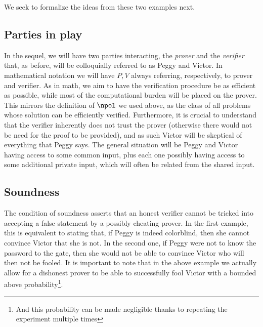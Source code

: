 \documentclass{article}
\begin{document}
We seek to formalize the ideas from these two examples next.

\subsection{Parties in play}
In the sequel, we will have two parties interacting, the \textit{prover} and the \textit{verifier} that, as before, will be colloquially referred to as Peggy and Victor. In mathematical notation we will have $P, V$ always referring, respectively, to prover and verifier. As in math, we aim to have the verification procedure be as efficient as possible, while most of the computational burden will be placed on the prover. This mirrors the definition of $\npol$ we used above, as the class of all problems whose solution can be efficiently verified. Furthermore, it is crucial to understand that the verifier inherently does not trust the prover (otherwise there would not be need for the proof to be provided), and as such Victor will be skeptical of everything that Peggy says. The general situation will be Peggy and Victor having access to some common input, plus each one possibly having access to some additional private input, which will often be related from the shared input.

\subsection{Soundness}
The condition of soundness asserts that an honest verifier cannot be tricked into accepting a false statement by a possibly cheating prover. In the first example, this is equivalent to stating that, if Peggy is indeed colorblind, then she cannot convince Victor that she is not. In the second one, if Peggy were not to know the password to the gate, then she would not be able to convince Victor who will then not be fooled. It is important to note that in the above example we actually allow for a dishonest prover to be able to successfully fool Victor with a bounded above probability\footnote{And this probability can be made negligible thanks to repeating the experiment multiple times}.
\end{document}
